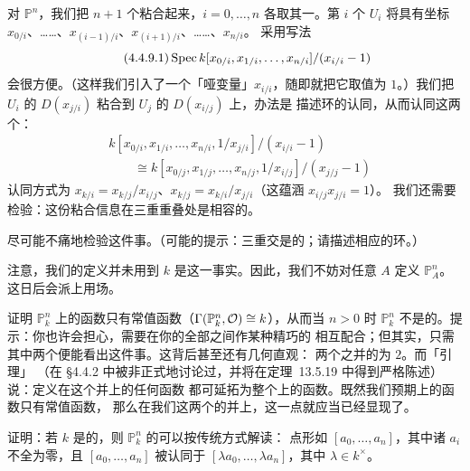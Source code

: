 对 $\mathbb{P}^n$，我们把 $n+1$ 个\trOpenSet{}粘合起来，$i=0,\dots,n$ 各取其一。第 $i$ 个%
\trOpenSet{} $U_i$ 将具有坐标 $x_{0/i}$、……、$x_{(i-1)/i}$、$x_{(i+1)/i}$、……、$x_{n/i}$。%
采用写法
\begin{equation*}\tag{4.4.9.1}\label{eq:proj-patches-notation}
\operatorname{Spec} k[x_{0/i},x_{1/i},\dots,x_{n/i}]/(x_{i/i}-1)
\end{equation*}
会很方便。（这样我们引入了一个「哑变量」$x_{i/i}$，随即就把它取值为 $1$。）我们把 $U_i$ 的%
\trDistinguishedOpen{} $D(x_{j/i})$ 粘合到 $U_j$ 的\trDistinguishedOpen{} $D(x_{i/j})$ 上，办法是%
描述环的认同，从而认同这两个\trScheme：
\[
\begin{aligned}
&k[x_{0/i},x_{1/i},\dots,x_{n/i},1/x_{j/i}]/(x_{i/i}-1)\\
&\qquad\cong k[x_{0/j},x_{1/j},\dots,x_{n/j},1/x_{i/j}]/(x_{j/j}-1)
\end{aligned}
\]
认同方式为 $x_{k/i}=x_{k/j}/x_{i/j}$、$x_{k/j}=x_{k/i}/x_{j/i}$（这蕴涵 $x_{i/j}x_{j/i}=1$）。%
我们还需要检验：这份粘合信息在三重重叠处是相容的。

\begin{exercise}\label{ex:proj-triple-overlap}
尽可能不痛地检验这件事。（可能的提示：三重交是\trAffine{}的；请描述相应的环。）
\end{exercise}

\begin{definition}[$\mathbb{P}^n_A$]\label{thm:projective-space-over-ring}
注意，我们的定义并未用到 $k$ 是\trField{}这一事实。因此，我们不妨对任意\emph{\trRing} $A$ 定义%
$\mathbb{P}^n_A$。这日后会派上用场。
\end{definition}

\begin{exercise}\label{ex:proj-functions-constant}
证明 $\mathbb{P}^n_k$ 上的函数只有常值函数（$\Gamma(\mathbb{P}^n_k,\mathcal{O})\cong k$），从而当 $n>0$ 时%
$\mathbb{P}^n_k$ 不是\trAffine{}的。提示：你也许会担心，需要在你的全部\trAffine\trOpenSet{}之间作某种精巧的%
相互配合；但其实，只需其中两个\trOpenSet{}便能看出这件事。这背后甚至还有几何直观：%
两个\trOpenSet{}之并的\trComplement{}\trCodimension{}为 $2$。而「\trAlgebraic{}\trHartogs{}引理」%
（在 \S4.4.2 中被非正式地讨论过，并将在定理~13.5.19 中得到严格陈述）说：定义在这个并上的任何函数%
都可延拓为整个\trProjectiveSpace{}上的函数。既然我们预期\trProjectiveSpace{}上的函数只有常值函数，%
那么在我们这两个\trAffine\trOpenSet{}的并上，这一点就应当已经显现了。
\end{exercise}

\begin{exercise}[推广 \S4.4.7]\label{ex:closed-points-pn-traditional}
证明：若 $k$ 是\trAlgClosed{}的，则 $\mathbb{P}^n_k$ 的\trClosedPoint{}可以按传统方式解读：%
点形如 $[a_0,\dots,a_n]$，其中诸 $a_i$ 不全为零，且 $[a_0,\dots,a_n]$ 被认同于%
$[\lambda a_0,\dots,\lambda a_n]$，其中 $\lambda\in k^{\times}$。
\end{exercise}

